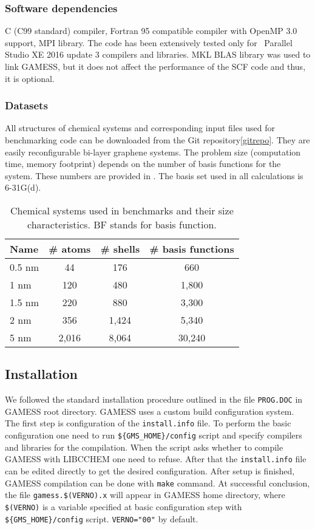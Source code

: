 \subsubsection{Software dependencies}
C (C99 standard) compiler, Fortran 95 compatible compiler with OpenMP 3.0 support, MPI library. The code has been extensively tested only for \intelreg\ Parallel Studio XE 2016 update 3 compilers and libraries. MKL BLAS library was used to link GAMESS, but it does not affect the performance of the SCF code and thus, it is optional.

\subsubsection{Datasets}
All structures of chemical systems and corresponding input files used for benchmarking code can be downloaded from the Git repository\cref{gitrepo}. They are easily reconfigurable bi-layer graphene systems. The problem size (computation time, memory footprint) depends on the number of basis functions for the system. These numbers are provided in . The basis set used in all calculations is 6-31G(d).

\begin{table}[ht]
	\centering
  	\caption{Chemical systems used in benchmarks and their size characteristics. BF stands for basis function.}
  	\label{tab:ad:chem}
  	\begin{tabular}{lccc}
    \toprule
    Name & \# atoms & \# shells & \# basis functions\\		 
    \midrule
    0.5 nm	&	44		&	176		&	660 \\
    1 nm	&	120		&	480		&	1,800 \\
	1.5 nm	&	220		&	880		&	3,300 \\
	2 nm	&	356		&	1,424	&	5,340 \\
	5 nm	&	2,016	&	8,064	&	30,240 \\
  	\bottomrule
\end{tabular}
\end{table}

\subsection{Installation}

We followed the standard installation procedure outlined in the file \texttt{PROG.DOC} in GAMESS root directory. GAMESS uses a custom build configuration system. The first step is configuration of the \texttt{install.info} file. To perform the basic configuration one need to run \texttt{\$\{GMS\_HOME\}/config} script and specify compilers and libraries for the compilation. When the script asks whether to compile GAMESS with LIBCCHEM one need to refuse. After that the \texttt{install.info} file can be edited directly to get the desired configuration. After setup is finished, GAMESS compilation can be done with \texttt{make} command. At successful conclusion, the file \texttt{gamess.\$(VERNO).x} will appear in GAMESS home directory, where \texttt{\$(VERNO)} is a variable specified at basic configuration step with \texttt{\$\{GMS\_HOME\}/config} script. \texttt{VERNO="00"} by default.


